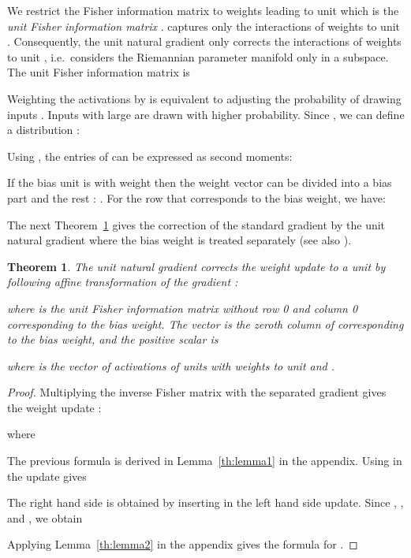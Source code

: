 \documentclass{article}
\newtheorem{theorem}{Theorem}
\begin{document}
We restrict the Fisher information matrix to weights leading to
unit  which is the {\em unit Fisher information matrix} .
 captures only the interactions of weights to
unit . Consequently, the unit natural gradient only corrects
the interactions of weights to unit , i.e.\ considers the
Riemannian parameter manifold only in a subspace.
The unit Fisher information matrix is

Weighting the activations by
 is equivalent to
adjusting the probability of drawing inputs . Inputs  with large
 are drawn with higher probability.
Since , we can define a
distribution  :

Using , the entries of  can be expressed as second moments:


If the bias unit is  with weight 
then the weight vector can be divided
into a bias part  and the rest : .
For the row 
that corresponds to the bias weight, we have:

The next Theorem~\ref{th:th1} gives the correction of the standard
gradient by the unit natural gradient where
the bias weight is treated separately (see also \citet{Yang:98}).
\begin{theorem}
\label{th:th1}
The unit natural gradient corrects the weight update
 to a unit  by
following affine transformation of
the gradient  :

where 
is the unit Fisher information matrix without row 0 and column 0
corresponding to the bias weight.
The vector  is the zeroth column of
 corresponding to the bias weight,
and the positive scalar  is

where  is the vector of activations of units with weights to unit  and
.
\end{theorem}

\begin{proof}
Multiplying the inverse Fisher matrix  with the separated
gradient 
gives the weight update :

where


The previous formula is derived in
Lemma~\ref{th:lemma1} in the appendix.
Using  in the update gives

The right hand side is obtained by inserting
 in the left hand side
update.
Since ,
,
and , we obtain

Applying Lemma~\ref{th:lemma2} in the appendix gives the formula for .
\end{proof}
\end{document}
